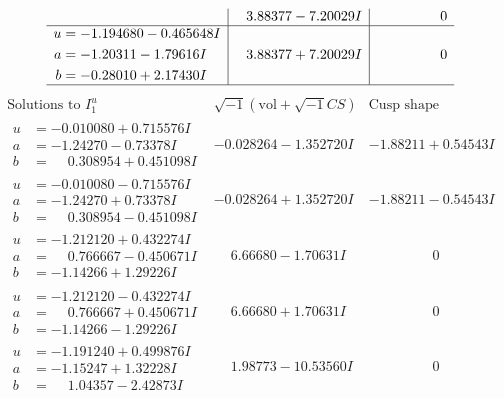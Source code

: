 \documentclass[1p]{elsarticle_modified}
\theoremstyle{definition}
\newcommand{\I}{\sqrt{-1}}
\begin{document}
$$\begin{array}{c|c|c}
 & \phantom{-}3.88377 - 7.20029 I & \phantom{-0.000000 } 0 \\ \hline\begin{aligned}
u &= -1.194680 - 0.465648 I \\
a &= -1.20311 - 1.79616 I \\
b &= -0.28010 + 2.17430 I\end{aligned}
 & \phantom{-}3.88377 + 7.20029 I & \phantom{-0.000000 } 0\\
 \hline 
 \end{array}$$\newpage$$\begin{array}{c|c|c}  
\text{Solutions to }I^u_{1}& \I (\text{vol} + \sqrt{-1}CS) & \text{Cusp shape}\\
 \hline 
\begin{aligned}
u &= -0.010080 + 0.715576 I \\
a &= -1.24270 - 0.73378 I \\
b &= \phantom{-}0.308954 + 0.451098 I\end{aligned}
 & -0.028264 - 1.352720 I & -1.88211 + 0.54543 I \\ \hline\begin{aligned}
u &= -0.010080 - 0.715576 I \\
a &= -1.24270 + 0.73378 I \\
b &= \phantom{-}0.308954 - 0.451098 I\end{aligned}
 & -0.028264 + 1.352720 I & -1.88211 - 0.54543 I \\ \hline\begin{aligned}
u &= -1.212120 + 0.432274 I \\
a &= \phantom{-}0.766667 - 0.450671 I \\
b &= -1.14266 + 1.29226 I\end{aligned}
 & \phantom{-}6.66680 - 1.70631 I & \phantom{-0.000000 } 0 \\ \hline\begin{aligned}
u &= -1.212120 - 0.432274 I \\
a &= \phantom{-}0.766667 + 0.450671 I \\
b &= -1.14266 - 1.29226 I\end{aligned}
 & \phantom{-}6.66680 + 1.70631 I & \phantom{-0.000000 } 0 \\ \hline\begin{aligned}
u &= -1.191240 + 0.499876 I \\
a &= -1.15247 + 1.32228 I \\
b &= \phantom{-}1.04357 - 2.42873 I\end{aligned}
 & \phantom{-}1.98773 - 10.53560 I & \phantom{-0.000000 } 0 \\ \hline\begin{aligned}

\end{aligned}
\end{array}$$
\end{document}

